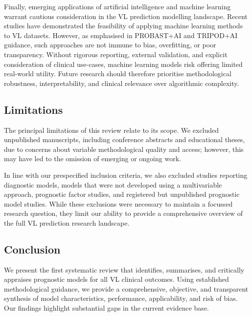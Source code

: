 Finally, emerging applications of artificial intelligence and machine learning warrant cautious consideration in the VL prediction modelling landscape. Recent studies have demonstrated the feasibility of applying machine learning methods to VL datasets\cite{kumar2025,donizette2025}. However, as emphasised in PROBAST+AI and TRIPOD+AI guidance, such approaches are not immune to bias, overfitting, or poor transparency\cite{collins2024A,moons2025}. Without rigorous reporting, external validation, and explicit consideration of clinical use-cases, machine learning models risk offering limited real-world utility. Future research should therefore prioritise methodological robustness, interpretability, and clinical relevance over algorithmic complexity.

\subsection{Limitations}

The principal limitations of this review relate to its scope. We excluded unpublished manuscripts, including conference abstracts and educational theses, due to concerns about variable methodological quality and access; however, this may have led to the omission of emerging or ongoing work.

In line with our prespecified inclusion criteria, we also excluded studies reporting diagnostic models\cite{camposPredictiveScoreInfectious1996, machadodeassisPredictiveModelsDiagnostic2012}, models that were not developed using a multivariable approach\cite{abdelmoulaVisceralLeishmaniasisChildren2003,verrest2021,takele2022}, prognostic factor studies\cite{collin2004,dasilvaPrognosticFactorsAssociated2020,oliveira-senaRiskFactorsInhospital2020,kajaia2011}, and registered but unpublished prognostic model studies\cite{NCT05602610}. While these exclusions were necessary to maintain a focussed research question, they limit our ability to provide a comprehensive overview of the full VL prediction research landscape.

\subsection{Conclusion}

We present the first systematic review that identifies, summarises, and critically appraises prognostic models for all VL clinical outcomes. Using established methodological guidance, we provide a comprehensive, objective, and transparent synthesis of model characteristics, performance, applicability, and risk of bias. Our findings highlight substantial gaps in the current evidence base.


